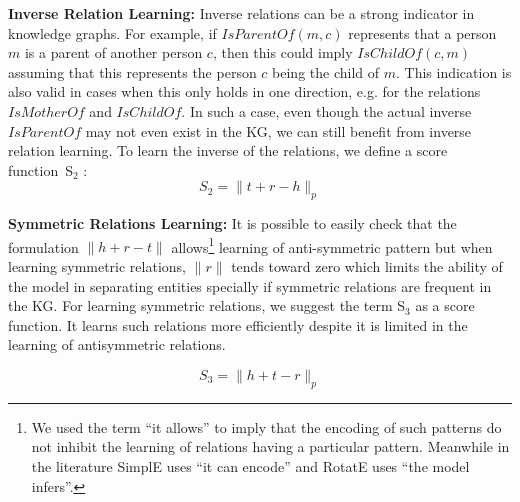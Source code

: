 \documentclass{ecai}
\begin{document}
\textbf{Inverse Relation Learning:} Inverse relations can be a strong indicator in knowledge graphs. For example, if $IsParentOf(m, c)$ represents that a person $m$ is a parent of another person $c$, then this could imply $IsChildOf(c, m)$ assuming that this represents the person $c$ being the child of $m$. This indication is also valid in cases when this only holds in one direction, e.g. for the relations $IsMotherOf$ and $IsChildOf$. In such a case, even though the actual inverse $IsParentOf$ may not even exist in the KG, we can still benefit from inverse relation learning.  
To learn the inverse of the relations, we define a score function~S$_2$ :
\begin{equation}\label{eq:2}
 S_2 = \parallel t + r - h\parallel_p
 \end{equation}


\textbf{Symmetric Relations Learning:} It is possible to easily check that the formulation $\parallel h+r-t \parallel $ allows\footnote{We used the term ``it allows'' to imply that the encoding of such patterns do not inhibit the learning of relations having a particular pattern. Meanwhile in the literature SimplE uses ``it can encode'' and RotatE uses ``the model infers''.} learning of anti-symmetric pattern but when learning symmetric relations, $\parallel r \parallel$ tends toward zero which limits the ability of the model in separating entities specially if symmetric relations are frequent in the KG. 
For learning  symmetric relations, we suggest the term S$_3$ as a score function. It learns such relations more efficiently despite it is limited in the learning of antisymmetric relations. 

\begin{equation}\label{eq:3}
    S_3 = \parallel h+t-r \parallel_p
\end{equation}
\end{document}
